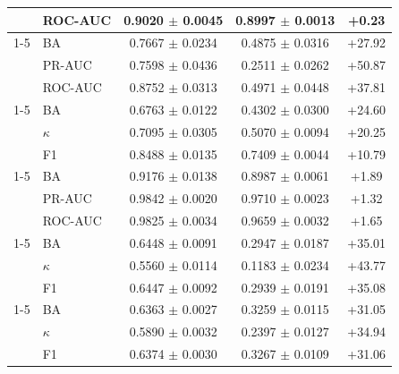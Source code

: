 \begin{table}[tbp]
\begin{tabular}{@{}l l c c c@{}}
 & ROC-AUC & 0.9020 $\pm$ 0.0045 & 0.8997 $\pm$ 0.0013 & +0.23 \\
\cmidrule(lr){1-5}
\multirow{3}{*}{MentalArithmetic} & BA & 0.7667 $\pm$ 0.0234 & 0.4875 $\pm$ 0.0316 & +27.92 \\
 & PR-AUC & 0.7598 $\pm$ 0.0436 & 0.2511 $\pm$ 0.0262 & +50.87 \\
 & ROC-AUC & 0.8752 $\pm$ 0.0313 & 0.4971 $\pm$ 0.0448 & +37.81 \\
\cmidrule(lr){1-5}
\multirow{3}{*}{TUEV} & BA & 0.6763 $\pm$ 0.0122 & 0.4302 $\pm$ 0.0300 & +24.60 \\
 & $\kappa$ & 0.7095 $\pm$ 0.0305 & 0.5070 $\pm$ 0.0094 & +20.25 \\
 & F1 & 0.8488 $\pm$ 0.0135 & 0.7409 $\pm$ 0.0044 & +10.79 \\
\cmidrule(lr){1-5}
\multirow{3}{*}{Mumtaz2016} & BA & 0.9176 $\pm$ 0.0138 & 0.8987 $\pm$ 0.0061 & +1.89 \\
 & PR-AUC & 0.9842 $\pm$ 0.0020 & 0.9710 $\pm$ 0.0023 & +1.32 \\
 & ROC-AUC & 0.9825 $\pm$ 0.0034 & 0.9659 $\pm$ 0.0032 & +1.65 \\
\cmidrule(lr){1-5}
\multirow{3}{*}{BCIC2020-3} & BA & 0.6448 $\pm$ 0.0091 & 0.2947 $\pm$ 0.0187 & +35.01 \\
 & $\kappa$ & 0.5560 $\pm$ 0.0114 & 0.1183 $\pm$ 0.0234 & +43.77 \\
 & F1 & 0.6447 $\pm$ 0.0092 & 0.2939 $\pm$ 0.0191 & +35.08 \\
\cmidrule(lr){1-5}
\multirow{3}{*}{FACED} & BA & 0.6363 $\pm$ 0.0027 & 0.3259 $\pm$ 0.0115 & +31.05 \\
 & $\kappa$ & 0.5890 $\pm$ 0.0032 & 0.2397 $\pm$ 0.0127 & +34.94 \\
 & F1 & 0.6374 $\pm$ 0.0030 & 0.3267 $\pm$ 0.0109 & +31.06 \\
\bottomrule\end{tabular}\end{table}

